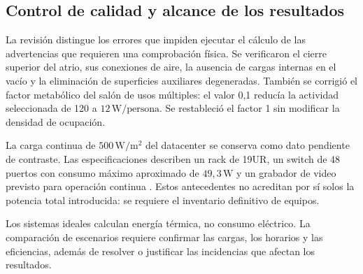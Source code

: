 \subsection{Control de calidad y alcance de los resultados}
\begin{textoDosTercios}
La revisión distingue los errores que impiden ejecutar el cálculo de las advertencias que requieren una comprobación física. Se verificaron el cierre superior del atrio, sus conexiones de aire, la ausencia de cargas internas en el vacío y la eliminación de superficies auxiliares degeneradas. También se corrigió el factor metabólico del salón de usos múltiples: el valor 0,1 reducía la actividad seleccionada de 120 a $12\,\mathrm{W/persona}$. Se restableció el factor 1 sin modificar la densidad de ocupación.

La carga continua de $500\,\mathrm{W/m^2}$ del datacenter se conserva como dato pendiente de contraste. Las especificaciones describen un rack de 19UR, un switch de 48 puertos con consumo máximo aproximado de $49,3\,\mathrm{W}$ y un grabador de video previsto para operación continua \parencite[pp.~84--85, 101--102]{mogrovejoEspecificacionesElectricasGalapagos}. Estos antecedentes no acreditan por sí solos la potencia total introducida: se requiere el inventario definitivo de equipos.
\end{textoDosTercios}


\begin{textoDosTercios}
Los sistemas ideales calculan energía térmica, no consumo eléctrico. La comparación de escenarios requiere confirmar las cargas, los horarios y las eficiencias, además de resolver o justificar las incidencias que afectan los resultados.
\end{textoDosTercios}
